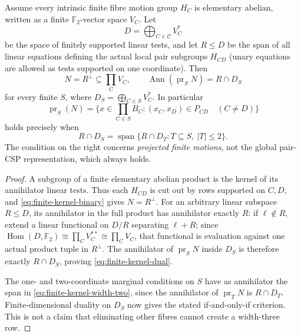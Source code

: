 \begin{theorem}
\label{thm:finite-kernel-linear-width-two}
Assume every intrinsic finite fibre motion group
$H_C$ is elementary abelian, written as a finite
$\mathbb F_2$-vector space $V_C$. Let
\[
 D=\bigoplus_{C\in\mathcal C}V_C^*
\]
be the space of finitely supported linear tests,
and let $R\le D$ be the span of all linear
equations defining the actual local pair
subgroups $H_{CD}$ (unary equations are
allowed as tests supported on one coordinate).
Then
\[
 N=R^\perp\subseteq\prod_CV_C,\qquad
 \operatorname{Ann}(\operatorname{pr}_S N)=
                       R\cap D_S
 \tag{FC5}\label{eq:finite-kernel-dual}
\]
for every finite $S$, where
$D_S=\bigoplus_{C\in S}V_C^*$. In particular
\[
 \operatorname{pr}_S(N)
 =\{x\in\prod_{C\in S}B_C:
     (x_C,x_D)\in P_{CD}\quad(C\ne D)\}
\]
holds precisely when
\[
 R\cap D_S=
 \operatorname{span}\{
        R\cap D_T:T\subseteq S,\ |T|\le2\}.
 \tag{FC6}\label{eq:finite-kernel-width-two}
\]
The condition on the right concerns
\emph{projected finite motions}, not the
global pair-CSP representation, which always
holds.
\end{theorem}
\begin{proof}
A subgroup of a finite elementary abelian
product is the kernel of its annihilator
linear tests. Thus each $H_{CD}$ is cut out
by rows supported on $C,D$, and
\eqref{eq:finite-kernel-binary} gives
$N=R^\perp$. For an arbitrary linear subspace
$R\le D$, its annihilator in the full product
has annihilator exactly $R$:
if $\ell\notin R$, extend a linear functional
on $D/R$ separating $\ell+R$; since
$\operatorname{Hom}(D,\mathbb F_2)
 \cong\prod_CV_C^{**}\cong\prod_CV_C$,
that functional is evaluation against one
actual product tuple in $R^\perp$.
The annihilator of $\operatorname{pr}_S N$
inside $D_S$ is therefore exactly $R\cap D_S$,
proving \eqref{eq:finite-kernel-dual}.

The one- and two-coordinate marginal conditions
on $S$ have as annihilator the span in
\eqref{eq:finite-kernel-width-two}, since the
annihilator of $\operatorname{pr}_T N$ is
$R\cap D_T$. Finite-dimensional duality on
$D_S$ now gives the stated if-and-only-if
criterion. This is not a claim that eliminating
other fibres cannot create a width-three row.
\end{proof}

